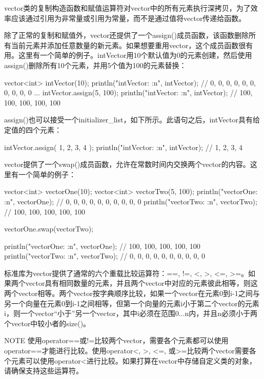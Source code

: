 vector类的复制构造函数和赋值运算符对vector中的所有元素执行深拷贝，为了效率应该通过引用为非常量或引用为常量，而不是通过值将vector传递给函数。

除了正常的复制和赋值外，vector还提供了一个assign()成员函数，该函数删除所有当前元素并添加任意数量的新元素。如果想要重用vector，这个成员函数很有用。这里有一个简单的例子。intVector用10个默认值为0的元素创建，然后使用assign()删除所有10个元素，并用5个值为100的元素替换：

\begin{cpp}
vector<int> intVector(10);
println("intVector: {:n}", intVector); // 0, 0, 0, 0, 0, 0, 0, 0, 0, 0
...
intVector.assign(5, 100);
println("intVector: {:n}", intVector); // 100, 100, 100, 100, 100
\end{cpp}

assign()也可以接受一个initializer\_list，如下所示。此语句之后，intVector具有给定值的四个元素：

\begin{cpp}
intVector.assign({ 1, 2, 3, 4 });
println("intVector: {:n}", intVector); // 1, 2, 3, 4
\end{cpp}

vector提供了一个swap()成员函数，允许在常数时间内交换两个vector的内容。这里有一个简单的例子：

\begin{cpp}
vector<int> vectorOne(10);
vector<int> vectorTwo(5, 100);
println("vectorOne: {:n}", vectorOne); // 0, 0, 0, 0, 0, 0, 0, 0, 0, 0
println("vectorTwo: {:n}", vectorTwo); // 100, 100, 100, 100, 100

vectorOne.swap(vectorTwo);

println("vectorOne: {:n}", vectorOne); // 100, 100, 100, 100, 100
println("vectorTwo: {:n}", vectorTwo); // 0, 0, 0, 0, 0, 0, 0, 0, 0, 0
\end{cpp}


标准库为vector提供了通常的六个重载比较运算符：==, !=, <, >, <=, >=。如果两个vector具有相同数量的元素，并且两个vector中对应的元素彼此相等，则这两个vector相等。两个vector按字典顺序比较，如果一个vector在元素0到i-1之间与另一个向量在元素0到i-1之间相等，但第一个向量的元素i小于第二个vector的元素i，则一个vector“小于”另一个vector，其中i必须在范围0...n内，并且n必须小于两个vector中较小者的size()。

\begin{myNotic}{NOTE}
使用operator==或!=比较两个vector，需要各个元素都可以使用operator==才能进行比较。使用operator<, >, <=, 或>=比较两个vector需要各个元素可以使用operator<进行比较。如果打算在vector中存储自定义类的对象，请确保支持这些运算符。
\end{myNotic}

